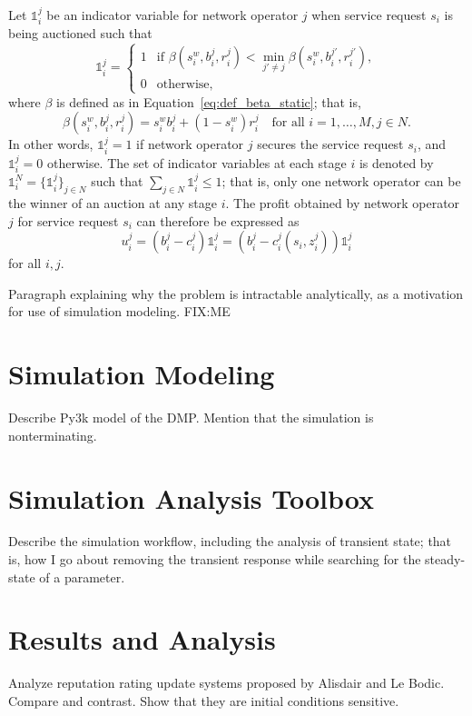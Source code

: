 Let $\mathds{1}^j_i$ be an indicator variable for network operator $j$ when service request $s_i$ is being auctioned such that
\begin{equation}
  \label{eq:indicator_function_dynamic}
  \mathds{1}^j_i = \left\{
  \begin{array}{ll}
    1 &\text{if } \beta(s^w_i,b^j_i,r^j_i) < \displaystyle\min_{j'\neq j} \beta(s^w_i,b^{j'}_i,r^{j'}_i),\\
    0 &\text{otherwise},
  \end{array}\right.
\end{equation}
where $\beta$ is defined as in Equation~\eqref{eq:def_beta_static}; that is,
\begin{equation}
  \label{eq:def_beta_dynamic}
  \beta(s^w_i,b^j_i,r^j_i) = s^w_i b^j_i + (1-s^w_i) r^j_i \quad\text{for all } i=1,\ldots,M, j\in N.
\end{equation}
In other words, $\mathds{1}^j_i = 1$ if network operator $j$ secures the service request $s_i$, and $\mathds{1}^j_i = 0$ otherwise. The set of indicator variables at each stage $i$ is denoted by $\mathds{1}^N_i=\{\mathds{1}^j_i\}_{j\in N}$ such that $\sum_{j\in N}\mathds{1}^j_i\le 1$; that is, only one network operator can be the winner of an auction at any stage $i$. The profit obtained by network operator $j$ for service request $s_i$ can therefore be expressed as
\begin{equation}
  \label{eq:def_no_profit_dynamic}
  u^j_i = \left(b^j_i - c^j_i\right)\mathds{1}^j_i = \left(b^j_i - c^j_i(s_i, z^j_i)\right)\mathds{1}^j_i
\end{equation}
for all $i,j$.

Paragraph explaining why the problem is intractable analytically, as a motivation for use of simulation modeling. FIX:ME 

\section{Simulation Modeling} %
\label{sec:simulation_modeling_dynamic}
Describe Py3k model of the DMP. Mention that the simulation is nonterminating.

\section{Simulation Analysis Toolbox} %
\label{sec:simulation_analysis_toolbox_dynamic}
Describe the simulation workflow, including the analysis of transient state; that is, how I go about removing the transient response while searching for the steady-state of a parameter.

\section{Results and Analysis} %
\label{sec:results_and_analysis_dynamic}
Analyze reputation rating update systems proposed by Alisdair and Le Bodic. Compare and contrast. Show that they are initial conditions sensitive.
